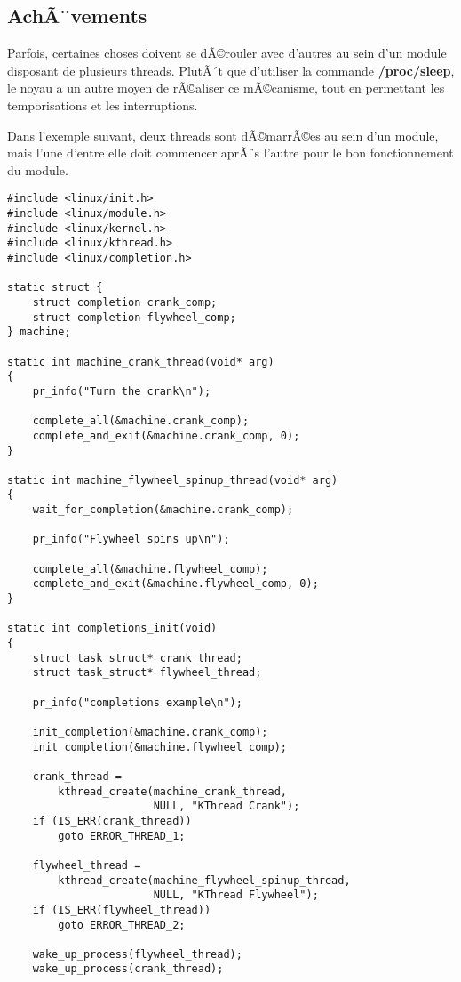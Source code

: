 \documentclass[11pt]{article}
\begin{document}
\subsection*{AchÃ¨vements}
\label{sec-11-2}

Parfois, certaines choses doivent se dÃ©rouler avec d'autres au sein d'un module disposant de plusieurs threads. PlutÃ´t que d'utiliser la commande \textbf{/proc/sleep}, le noyau a un autre moyen de rÃ©aliser ce mÃ©canisme, tout en permettant les temporisations et les interruptions.

Dans l'exemple suivant, deux threads sont dÃ©marrÃ©es au sein d'un module, mais l'une d'entre elle doit commencer aprÃ¨s l'autre pour le bon fonctionnement du module.

\begin{verbatim}
#include <linux/init.h>
#include <linux/module.h>
#include <linux/kernel.h>
#include <linux/kthread.h>
#include <linux/completion.h>

static struct {
    struct completion crank_comp;
    struct completion flywheel_comp;
} machine;

static int machine_crank_thread(void* arg)
{
    pr_info("Turn the crank\n");

    complete_all(&machine.crank_comp);
    complete_and_exit(&machine.crank_comp, 0);
}

static int machine_flywheel_spinup_thread(void* arg)
{
    wait_for_completion(&machine.crank_comp);

    pr_info("Flywheel spins up\n");

    complete_all(&machine.flywheel_comp);
    complete_and_exit(&machine.flywheel_comp, 0);
}

static int completions_init(void)
{
    struct task_struct* crank_thread;
    struct task_struct* flywheel_thread;

    pr_info("completions example\n");

    init_completion(&machine.crank_comp);
    init_completion(&machine.flywheel_comp);

    crank_thread =
        kthread_create(machine_crank_thread,
                       NULL, "KThread Crank");
    if (IS_ERR(crank_thread))
        goto ERROR_THREAD_1;

    flywheel_thread =
        kthread_create(machine_flywheel_spinup_thread,
                       NULL, "KThread Flywheel");
    if (IS_ERR(flywheel_thread))
        goto ERROR_THREAD_2;

    wake_up_process(flywheel_thread);
    wake_up_process(crank_thread);


\end{verbatim}
\end{document}
